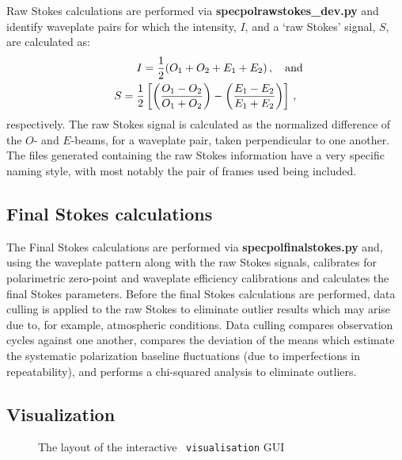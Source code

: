 Raw Stokes calculations are performed via \textbf{specpolraw\-stokes\_dev.py} and identify waveplate pairs for which the intensity, $I$, and a `raw Stokes' signal, $S$, are calculated as:
\begin{equation}
    \begin{gathered}
        I = \frac{1}{2} (O_{1} + O_{2} + E_{1} + E_{2})\,,\rlap{\quad and}\\
        S = \frac{1}{2} \left[ \left( \frac{O_{1} - O_{2}}{O_{1} + O_{2}} \right) - \left( \frac{E_{1} - E_{2}}{E_{1} + E_{2}} \right) \right]\,,
    \end{gathered}\label{eq:polsalt_rawstokes}
\end{equation}
respectively. The raw Stokes signal is calculated as the normalized difference of the $O$- and $E$-beams, for a waveplate pair, taken perpendicular to one another. The files generated containing the raw Stokes information have a very specific naming style, with most notably the pair of frames used being included.

\subsection{Final Stokes calculations}

The Final Stokes calculations are performed via \textbf{specpolfinalstokes.py} and, using the waveplate pattern along with the raw Stokes signals, calibrates for polarimetric zero-point and waveplate efficiency calibrations and calculates the final Stokes parameters. Before the final Stokes calculations are performed, data culling is applied to the raw Stokes to eliminate outlier results which may arise due to, for example, atmospheric conditions. Data culling compares observation cycles against one another, compares the deviation of the means which estimate the systematic polarization baseline fluctuations (due to imperfections in repeatability), and performs a chi-squared analysis to eliminate outliers.

\subsection{Visualization}

\begin{figure}[t]
    \centering
    \caption{The layout of the interactive \polsalt\ \texttt{visualisation} \gls{GUI}}
    \label{fig:polsalt_gui_vis}
\end{figure}

